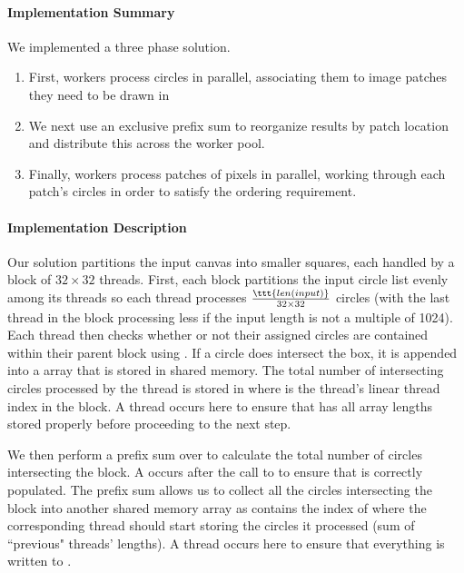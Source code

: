 \documentclass[11pt]{article}
\begin{document}
\paragraph{Implementation Summary}
We implemented a three phase solution.
\begin{enumerate}
  \item First, workers process circles in parallel, associating them to image
    patches they need to be drawn in
  \item We next use an exclusive prefix sum to reorganize results by patch
    location and distribute this across the worker pool.
  \item Finally, workers process patches of pixels in parallel, working through
    each patch’s circles in order to satisfy the ordering requirement.
\end{enumerate}

\paragraph{Implementation Description} Our solution partitions the input canvas
into smaller squares, each handled by a block of $32 \times 32$ threads. First,
each block partitions the input circle list evenly among its threads so each
thread processes $\frac{\ttt{len(input)}}{32 \times 32}$ circles (with the last
thread in the block processing less if the input length is not a multiple of
1024). Each thread then checks whether or not their assigned circles are
contained within their parent block using . If a circle does
intersect the box, it is appended into a  array that is
stored in shared memory. The total number of intersecting circles processed by
the thread is stored in  where  is the
thread's linear thread index in the block. A thread  occurs here
to ensure that  has all array lengths stored properly
before proceeding to the next step.

\smallskip
We then perform a prefix sum over  to calculate the total
number of circles intersecting the block. A  occurs after the call
to  to ensure that  is
correctly populated. The prefix sum allows us to collect all the circles
intersecting the block into another shared memory array 
as  contains the index of where the corresponding
thread should start storing the circles it processed (sum of ``previous"
threads'  lengths). A thread  occurs here
to ensure that everything is written to .
\end{document}

